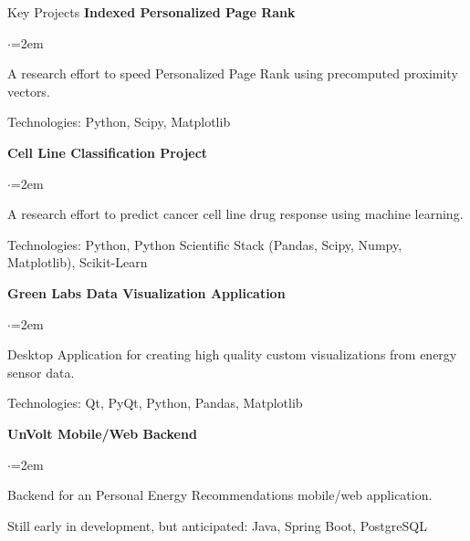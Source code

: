\documentclass{resume} %
\begin{document}
\begin{rSection}{Key Projects}
{\bf Indexed Personalized Page Rank}
\begin{list}{$\cdot$}{\leftmargin=2em}
\vspace{-.5em}
\item A research effort to speed Personalized Page Rank using precomputed proximity vectors.
\vspace{-.5em}
\item Technologies: Python, Scipy, Matplotlib
\vspace{-.5em}
\end{list}

{\bf Cell Line Classification Project}
\begin{list}{$\cdot$}{\leftmargin=2em}
\vspace{-.5em}
\item A research effort to predict cancer cell line drug response using machine learning.
\vspace{-.5em}
\item Technologies: Python, Python Scientific Stack (Pandas, Scipy, Numpy, Matplotlib), Scikit-Learn
\vspace{-.5em}
\end{list}

{\bf Green Labs Data Visualization Application}

\begin{list}{$\cdot$}{\leftmargin=2em}
\vspace{-.5em}
\item Desktop Application for creating high quality custom visualizations from energy sensor data.
\vspace{-.5em}
\item Technologies: Qt, PyQt, Python, Pandas, Matplotlib
\vspace{-.5em}
\end{list}

{\bf UnVolt Mobile/Web Backend}
\begin{list}{$\cdot$}{\leftmargin=2em}
\vspace{-.5em}
\item Backend for an Personal Energy Recommendations mobile/web application.
\vspace{-.5em}
\item Still early in development, but anticipated: Java, Spring Boot, PostgreSQL
\vspace{-.5em}
\end{list}
\end{rSection}
\end{document}
